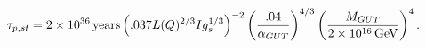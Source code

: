 \begin{equation}\label{stringlife}
\tau_{p,st}=2\times 10^{36}\,{\rm
years}\left(.037L(Q)^{2/3}Ig_s^{1/3}\right)^{-2}\left(.04\over
\alpha_{GUT}\right)^{4/3}\left(M_{GUT}\over 2\times 10^{16}\,{\rm
GeV}\right)^4.
\end{equation}

